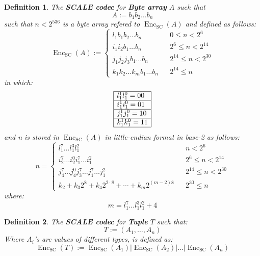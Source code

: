 \documentclass{article}
\newcommand{\assign}{:=}
\newcommand{\cdummy}{\cdot}
\newcommand{\nosymbol}{}
\newcommand{\tmop}[1]{\ensuremath{\operatorname{#1}}}
\newcommand{\tmstrong}[1]{\textbf{#1}}
\newcommand{\tmtextbf}[1]{{\bfseries{#1}}}
\newtheorem{definition}{Definition}
\providecommand{\cdummy}{{\cdot}}
\providecommand{\nosymbol}{}
\providecommand{\tmop}[1]{\ensuremath{\mathrm{#1}}}
\providecommand{\tmstrong}[1]{\tmtextbf{#1}}
\providecommand{\tmtextbf}[1]{\tmtextbf{#1}}
\newtheorem{definition}{Definition}
\begin{document}
\begin{definition}
  The {\tmstrong{SCALE codec}} for {\tmstrong{Byte array}} $A$ such that
  \[ A \assign b_1 b_2 \ldots b_n \]
  such that $n < 2^{536}$ is a byte array refered to $\tmop{Enc}_{\tmop{SC}}
  (A)$ and defined as follows:
  \[ \tmop{Enc}_{\tmop{SC}} (A) \assign \left\{ \begin{array}{lll}
       l^{\nosymbol}_1 b_1 b_2 \ldots b_n &  & 0 \leqslant n < 2^6\\
       i^{\nosymbol}_1 i^{\nosymbol}_2 b_1 \ldots b_n &  & 2^6 \leqslant n <
       2^{14}\\
       j^{\nosymbol}_1 j^{\nosymbol}_2 j_3 b_1 \ldots b_n &  & 2^{14}
       \leqslant n < 2^{30}\\
       k_1^{\nosymbol} k_2^{\nosymbol} \ldots k_m^{\nosymbol} b_1 \ldots b_n &
       & 2^{14} \leqslant n
     \end{array} \right. \]
  in which:{\hspace{0.17em}}
  \[ \begin{array}{|l|}
       \hline
       l^1_1 l_1^0 = 00\\
       \hline
       i^1_1 i_1^0 = 01\\
       \hline
       j^1_1 j_1^0 = 10\\
       \hline
       k^1_1 k_1^0 = 11\\
       \hline
     \end{array} \]
  and n is stored in $\tmop{Enc}_{\tmop{SC}} (A)$ in little-endian format in
  base-2 as follows:
  \[ n = \left\{ \begin{array}{lll}
       l^7_1 \ldots l^3_1 l^2_1 &  & n < 2^6\\
       i_2^7 \ldots i_2^0 i_1^7 \ldots i^2_1^{\nosymbol} &  & 2^6 \leqslant n
       < 2^{14}\\
       j_4^7 \ldots j_4^0 j_3^7 \ldots j_1^7 \ldots j^2_1 &  & 2^{14}
       \leqslant n < 2^{30}\\
       k_2 + k_3 2^8 + k_4 2^{2 \cdummy 8} + \cdots + k_m 2^{(m - 2) 8} &  &
       2^{30} \leqslant n
     \end{array} \right. \]
  where:
  \[ m = l^7_1 \ldots l^3_1 l^2_1 + 4 \]
\end{definition}

\begin{definition}
  The {\tmstrong{SCALE codec}} for {\tmstrong{Tuple}} $T$ such that:
  \[ T \assign (A_1, \ldots, A_n) \]
  Where $A_i$'s are values of different types, is defined as:
  \[ \tmop{Enc}_{\tmop{SC}} (T) \assign \tmop{Enc}_{\tmop{SC}} (A_1) |
     \tmop{Enc}_{\tmop{SC}} (A_2) | \ldots | \tmop{Enc}_{\tmop{SC}} (A_n) \]
\end{definition}
\end{document}
